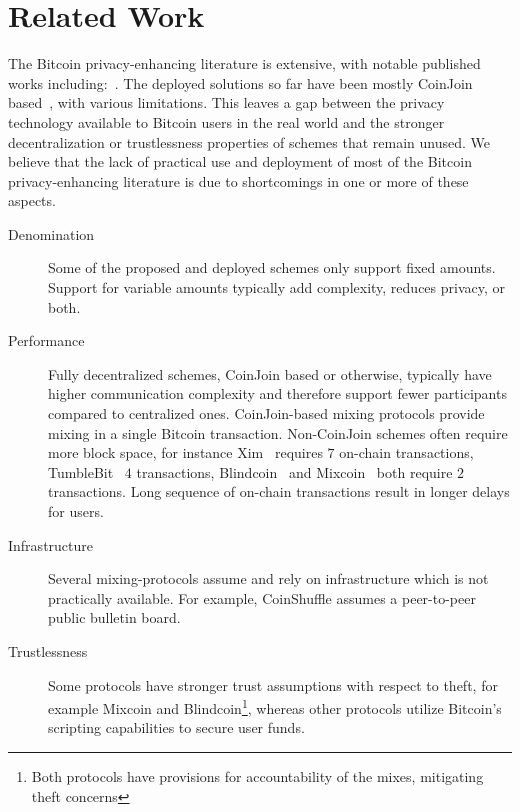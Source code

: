 \documentclass[a4paper]{article}
\begin{document}
\section{Related Work}\label{sec:relatedwork}

The Bitcoin privacy-enhancing literature is extensive, with notable published works including:~\cite{bonneau2014mixcoin,bissias2014sybil,ruffing2014coinshuffle,valenta2015blindcoin,ziegeldorf2015coinparty,ruffing2017p2p,maurer2017anonymous,heilman2017tumblebit}. The deployed solutions so far have been mostly CoinJoin based~\cite{maxwell2013coinjoin}, with various limitations. This leaves a gap between the privacy technology available to Bitcoin users in the real world and the stronger decentralization or trustlessness properties of schemes that remain unused. We believe that the lack of practical use and deployment of most of the Bitcoin privacy-enhancing literature is due to shortcomings in one or more of these aspects.

\begin{description}
 \item[Denomination] Some of the proposed and deployed schemes only support fixed amounts. Support for variable amounts typically add complexity, reduces privacy, or both.
 \item[Performance] Fully decentralized schemes, CoinJoin based or otherwise, typically have higher communication complexity and therefore support fewer participants compared to centralized ones. CoinJoin-based mixing protocols provide mixing in a single Bitcoin transaction. Non-CoinJoin schemes often require more block space, for instance Xim~\cite{bissias2014sybil} requires $7$ on-chain transactions, TumbleBit~\cite{heilman2017tumblebit} $4$ transactions, Blindcoin~\cite{valenta2015blindcoin} and Mixcoin~\cite{bonneau2014mixcoin} both require $2$ transactions. Long sequence of on-chain transactions result in longer delays for users.
 \item[Infrastructure] Several mixing-protocols assume and rely on infrastructure which is not practically available. For example, CoinShuffle assumes a peer-to-peer public bulletin board.
 \item[Trustlessness] Some protocols have stronger trust assumptions with respect to theft, for example Mixcoin and Blindcoin\footnote{Both protocols have provisions for accountability of the mixes, mitigating theft concerns}, whereas other protocols utilize Bitcoin's scripting capabilities to secure user funds.
\end{description}
\end{document}
